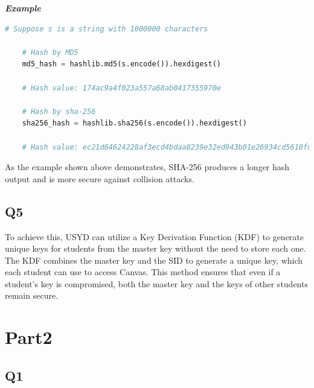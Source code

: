 \documentclass{article}
\begin{document}
\textbf{\textit{Example}}

	\begin{lstlisting}[language=Python]
	# Suppose s is a string with 1000000 characters

	# Hash by MD5
	md5_hash = hashlib.md5(s.encode()).hexdigest()

	# Hash value: 174ac9a4f023a557a68ab0417355970e

	# Hash by sha-256
	sha256_hash = hashlib.sha256(s.encode()).hexdigest()

	# Hash value: ec21d64624228af3ecd4bdaa8239e32ed943b01e26934cd5610fddb361426dc6
	\end{lstlisting}

	As the example shown above demonstrates, SHA-256 produces a longer hash output and is more secure against collision attacks.

\subsection{Q5}

	To achieve this, USYD can utilize a Key Derivation Function (KDF) to generate unique keys for students from the master key without the need to store each one. The KDF combines the master key and the SID to generate a unique key\cite{adams2004security}, which each student can use to access Canvas. This method ensures that even if a student's key is compromised, both the master key and the keys of other students remain secure.


\section{Part2}

\subsection{Q1}
\end{document}
